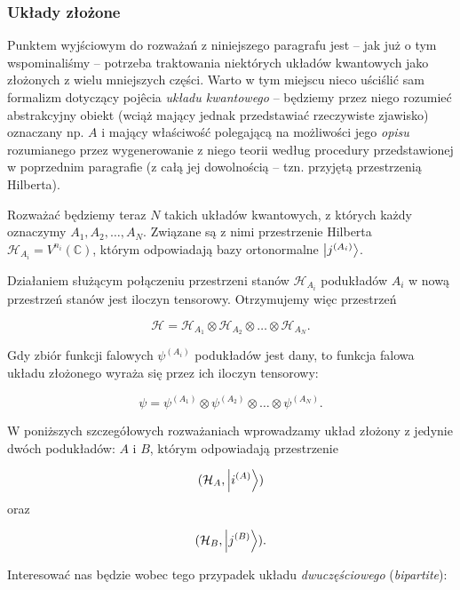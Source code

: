 \subsubsection{Układy złożone}

Punktem wyjściowym do rozważań z niniejszego paragrafu jest -- jak już o tym wspominaliśmy -- potrzeba traktowania niektórych układów kwantowych jako złożonych z wielu mniejszych części. Warto w tym miejscu nieco uściślić sam formalizm dotyczący pojêcia \textit{układu kwantowego} -- będziemy przez niego rozumieć abstrakcyjny obiekt (wciąż mający jednak przedstawiać rzeczywiste zjawisko) oznaczany np. $A$ i mający właściwość polegającą na możliwości jego \textit{opisu} rozumianego przez wygenerowanie z niego teorii według procedury przedstawionej w poprzednim paragrafie (z całą jej dowolnością -- tzn. przyjętą przestrzenią Hilberta).

Rozważać będziemy teraz $N$ takich układów kwantowych, z których każdy oznaczymy $A_1, A_2, \ldots, A_N$. Związane są z nimi przestrzenie Hilberta $\mathcal{H}_{A_i} = V ^ {n_i}(\mathbb{C})$, którym odpowiadają bazy ortonormalne $\ket{j^{(A_i)}}$.

\begin{definition}
    \label{definition:complex-system}
    Działaniem służącym połączeniu przestrzeni stanów $\mathcal{H}_{A_i}$ podukładów $A_i$ w nową przestrzeń stanów jest iloczyn tensorowy. Otrzymujemy więc przestrzeń

    $$
        \mathcal{H} = \mathcal{H}_{A_1} \otimes \mathcal{H}_{A_2} \otimes \ldots \otimes \mathcal{H}_{A_N}.
    $$

    Gdy zbiór funkcji falowych $\psi ^ {(A_i)}$ podukładów jest dany, to funkcja falowa układu złożonego wyraża się przez ich iloczyn tensorowy:

    \begin{equation}
        \label{equation:productstate}
        \psi=\psi ^ {(A_1)} \otimes \psi ^ {(A_2)} \otimes \ldots \otimes \psi^{(A_N)}.
    \end{equation}
\end{definition}

W poniższych szczegółowych rozważaniach wprowadzamy układ złożony z jedynie dwóch podukładów: $A$ i $B$, którym odpowiadają przestrzenie

$$
    (\mathcal{H}_A, \ket{i^{(A)}})
$$
oraz

$$
    (\mathcal{H}_B, \ket{j^{(B)}}).
$$

Interesować nas będzie wobec tego przypadek układu \textit{dwuczęściowego} (\textit{bipartite}):


